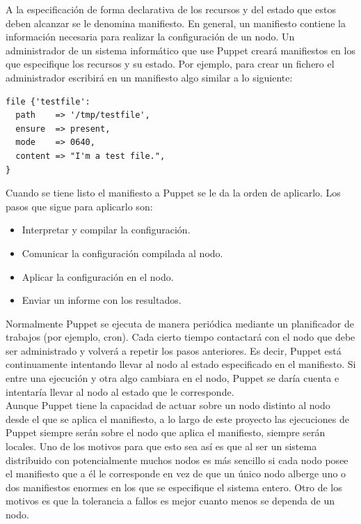A la especificación de forma declarativa de los recursos y del estado que estos deben alcanzar se le denomina manifiesto. En general, un manifiesto contiene la información necesaria para realizar la configuración de un nodo. Un administrador de un sistema informático que use Puppet creará manifiestos en los que especifique los recursos y su estado. Por ejemplo, para crear un fichero el administrador escribirá en un manifiesto algo similar a lo siguiente:

\pagebreak

\begin{lstlisting}
file {'testfile':
  path    => '/tmp/testfile',
  ensure  => present,
  mode    => 0640,
  content => "I'm a test file.",
}
\end{lstlisting}

Cuando se tiene listo el manifiesto a Puppet se le da la orden de aplicarlo. Los pasos que sigue para aplicarlo son:

\begin{itemize}
\item Interpretar y compilar la configuración.
\item Comunicar la configuración compilada al nodo.
\item Aplicar la configuración en el nodo.
\item Enviar un informe con los resultados.
\end{itemize}


Normalmente Puppet se ejecuta de manera periódica mediante un planificador de trabajos (por ejemplo, cron). Cada cierto tiempo contactará con el nodo que debe ser administrado y volverá a repetir los pasos anteriores. Es decir, Puppet está continuamente intentando llevar al nodo al estado especificado en el manifiesto. Si entre una ejecución y otra algo cambiara en el nodo, Puppet se daría cuenta e intentaría llevar al nodo al estado que le corresponde. \\

Aunque Puppet tiene la capacidad de actuar sobre un nodo distinto al nodo desde el que se aplica el manifiesto, a lo largo de este proyecto las ejecuciones de Puppet siempre serán sobre el nodo que aplica el manifiesto, siempre serán locales. Uno de los motivos para que esto sea así es que al ser un sistema distribuido con potencialmente muchos nodos es más sencillo si cada nodo posee el manifiesto que a él le corresponde en vez de que un único nodo alberge uno o dos manifiestos enormes en los que se especifique el sistema entero. Otro de los motivos es que la tolerancia a fallos es mejor cuanto menos se dependa de un nodo. \\

